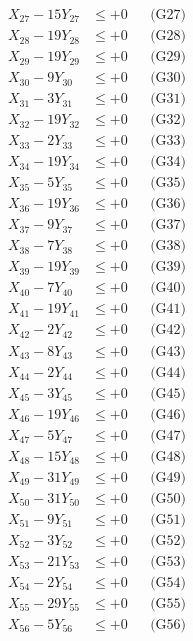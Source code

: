 \documentclass[a4paper,10pt]{article}
\begin{document}
{\begin{align}
X_{27} - 15Y_{27} &\leq +0 && \text{(G27)} \\
\allowbreak
X_{28} - 19Y_{28} &\leq +0 && \text{(G28)} \\
X_{29} - 19Y_{29} &\leq +0 && \text{(G29)} \\
X_{30} - 9Y_{30} &\leq +0 && \text{(G30)} \\
X_{31} - 3Y_{31} &\leq +0 && \text{(G31)} \\
X_{32} - 19Y_{32} &\leq +0 && \text{(G32)} \\
X_{33} - 2Y_{33} &\leq +0 && \text{(G33)} \\
X_{34} - 19Y_{34} &\leq +0 && \text{(G34)} \\
X_{35} - 5Y_{35} &\leq +0 && \text{(G35)} \\
X_{36} - 19Y_{36} &\leq +0 && \text{(G36)} \\
X_{37} - 9Y_{37} &\leq +0 && \text{(G37)} \\
\allowbreak
X_{38} - 7Y_{38} &\leq +0 && \text{(G38)} \\
X_{39} - 19Y_{39} &\leq +0 && \text{(G39)} \\
X_{40} - 7Y_{40} &\leq +0 && \text{(G40)} \\
X_{41} - 19Y_{41} &\leq +0 && \text{(G41)} \\
X_{42} - 2Y_{42} &\leq +0 && \text{(G42)} \\
X_{43} - 8Y_{43} &\leq +0 && \text{(G43)} \\
X_{44} - 2Y_{44} &\leq +0 && \text{(G44)} \\
X_{45} - 3Y_{45} &\leq +0 && \text{(G45)} \\
X_{46} - 19Y_{46} &\leq +0 && \text{(G46)} \\
X_{47} - 5Y_{47} &\leq +0 && \text{(G47)} \\
\allowbreak
X_{48} - 15Y_{48} &\leq +0 && \text{(G48)} \\
X_{49} - 31Y_{49} &\leq +0 && \text{(G49)} \\
X_{50} - 31Y_{50} &\leq +0 && \text{(G50)} \\
X_{51} - 9Y_{51} &\leq +0 && \text{(G51)} \\
X_{52} - 3Y_{52} &\leq +0 && \text{(G52)} \\
X_{53} - 21Y_{53} &\leq +0 && \text{(G53)} \\
X_{54} - 2Y_{54} &\leq +0 && \text{(G54)} \\
X_{55} - 29Y_{55} &\leq +0 && \text{(G55)} \\
X_{56} - 5Y_{56} &\leq +0 && \text{(G56)} \\

\end{align}}
\end{document}
